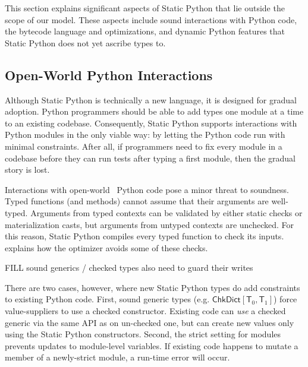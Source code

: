 \documentclass[english,cleveref,submission]{programming}
\newcommand{\SP}{Static Python}
\newcommand{\typefont}[1]{\mathsf{#1}}
\newcommand{\paramtype}[2]{#1[#2]}
\newcommand{\sptype}{\typefont{T}}
\newcommand{\sptchkdict}[2]{\paramtype{\typefont{ChkDict}}{#1, #2}}
\begin{document}


This section explains significant aspects of \SP{} that lie outside the
scope of our model.
These aspects include sound interactions with Python code,
the bytecode language and optimizations, and dynamic Python features
that \SP{} does not yet ascribe types to.


\subsection{Open-World Python Interactions}

Although \SP{} is technically a new language, it is designed for gradual adoption.
Python programmers should be able to add types one module at a time to an
existing codebase.
Consequently, \SP{} supports interactions with Python modules in the only viable
way: by letting the Python code run with minimal constraints.
After all, if programmers need to fix every module in a codebase before they can
run tests after typing a first module, then the gradual story is lost.

Interactions with open-world~\cite{vss-popl-2017} Python code pose a minor
threat to soundness.
Typed functions (and methods) cannot assume that their arguments are
well-typed.
Arguments from typed contexts can be validated by either static checks
or materialization casts, but arguments from untyped contexts are unchecked.
For this reason, \SP{} compiles every typed function to check its inputs.
 explains how the optimizer avoids some of these checks.

FILL sound generics / checked types also need to guard their writes

There are two cases, however, where new \SP{} types do add constraints to
existing Python code.
First, sound generic types (e.g. $\sptchkdict{\sptype_0}{\sptype_1}$)
force value-suppliers to use a checked constructor.
Existing code can \emph{use}\/ a checked generic via the same API as on
un-checked one, but can create new values only using the \SP{} constructors.
Second, the strict setting for modules prevents updates to module-level variables.
If existing code happens to mutate a member of a newly-strict module, a run-time
error will occur.
\end{document}
